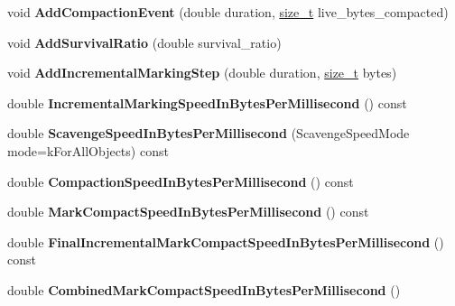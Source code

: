 \begin{DoxyCompactItemize}
void {\bfseries Add\+Compaction\+Event} (double duration, \mbox{\hyperlink{classsize__t}{size\+\_\+t}} live\+\_\+bytes\+\_\+compacted)
\item 
\mbox{\label{classv8_1_1internal_1_1GCTracer_a26a772bd4a6be905a7903adb61d3b755}} 
void {\bfseries Add\+Survival\+Ratio} (double survival\+\_\+ratio)
\item 
\mbox{\label{classv8_1_1internal_1_1GCTracer_aa3d84ece30c257c88b53a328a53fd064}} 
void {\bfseries Add\+Incremental\+Marking\+Step} (double duration, \mbox{\hyperlink{classsize__t}{size\+\_\+t}} bytes)
\item 
\mbox{\label{classv8_1_1internal_1_1GCTracer_aa572c9a20eca67e3b2c5b8854d203f14}} 
double {\bfseries Incremental\+Marking\+Speed\+In\+Bytes\+Per\+Millisecond} () const
\item 
\mbox{\label{classv8_1_1internal_1_1GCTracer_abcbf0f0cc59aa29ee31a11f077377723}} 
double {\bfseries Scavenge\+Speed\+In\+Bytes\+Per\+Millisecond} (Scavenge\+Speed\+Mode mode=k\+For\+All\+Objects) const
\item 
\mbox{\label{classv8_1_1internal_1_1GCTracer_a22e93f91aff3d57aa43cc603f64af59e}} 
double {\bfseries Compaction\+Speed\+In\+Bytes\+Per\+Millisecond} () const
\item 
\mbox{\label{classv8_1_1internal_1_1GCTracer_a53ee7709614136d652843c59b895c234}} 
double {\bfseries Mark\+Compact\+Speed\+In\+Bytes\+Per\+Millisecond} () const
\item 
\mbox{\label{classv8_1_1internal_1_1GCTracer_a32901a7c0840f1ae65cdbc7677cb51af}} 
double {\bfseries Final\+Incremental\+Mark\+Compact\+Speed\+In\+Bytes\+Per\+Millisecond} () const
\item 
\mbox{\label{classv8_1_1internal_1_1GCTracer_a2181fbcea7dbac27153923601b09f0dd}} 
double {\bfseries Combined\+Mark\+Compact\+Speed\+In\+Bytes\+Per\+Millisecond} ()
\item 
\mbox{\label{classv8_1_1internal_1_1GCTracer_af5ca30fd6701979999cd5731e6bd98f2}} 

\end{DoxyCompactItemize}
